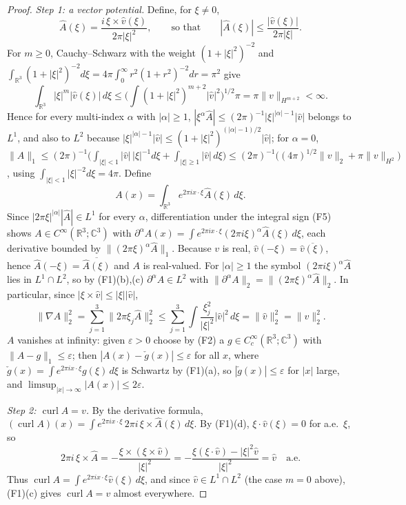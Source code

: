 \documentclass[11pt]{article}
\theoremstyle{definition}
\theoremstyle{plain}
\newcommand{\R}{\mathbb R}
\newcommand{\norm}[1]{\lVert #1\rVert}
\begin{document}
\begin{proof}
\emph{Step 1: a vector potential.}  Define, for $\xi\neq0$,
\[
 \hat A(\xi)=\frac{i\,\xi\times\hat v(\xi)}{2\pi|\xi|^2},
 \qquad\text{so that}\qquad |\hat A(\xi)|\leq\frac{|\hat v(\xi)|}{2\pi|\xi|}.
\]
For $m\geq0$, Cauchy--Schwarz with the weight $(1+|\xi|^2)^{-2}$ and
$\int_{\R^3}(1+|\xi|^2)^{-2}d\xi=4\pi\int_0^\infty r^2(1+r^2)^{-2}dr=\pi^2$
give
\[
 \int_{\R^3}|\xi|^m|\hat v(\xi)|\,d\xi
 \leq\Big(\int(1+|\xi|^2)^{m+2}|\hat v|^2\Big)^{1/2}\pi
 =\pi\norm v_{H^{m+2}}<\infty .
\]
Hence for every multi-index $\alpha$ with $|\alpha|\geq1$,
$|\xi^\alpha\hat A|\leq(2\pi)^{-1}|\xi|^{|\alpha|-1}|\hat v|$ belongs to $L^1$,
and also to $L^2$ because $|\xi|^{|\alpha|-1}|\hat v|\leq(1+|\xi|^2)^{(|\alpha|-1)/2}|\hat v|$;
for $\alpha=0$,
$\norm{\hat A}_1\leq(2\pi)^{-1}\big(\int_{|\xi|<1}|\hat v|\,|\xi|^{-1}d\xi
+\int_{|\xi|\geq1}|\hat v|\,d\xi\big)
\leq(2\pi)^{-1}\big((4\pi)^{1/2}\norm v_2+\pi\norm v_{H^2}\big)$,
using $\int_{|\xi|<1}|\xi|^{-2}d\xi=4\pi$.  Define
\[
 A(x)=\int_{\R^3}e^{2\pi ix\cdot\xi}\hat A(\xi)\,d\xi .
\]
Since $|2\pi\xi|^{|\alpha|}|\hat A|\in L^1$ for every $\alpha$, differentiation
under the integral sign (F5) shows $A\in C^\infty(\R^3;\mathbb C^3)$ with
$\partial^\alpha A(x)=\int e^{2\pi ix\cdot\xi}(2\pi i\xi)^\alpha\hat A(\xi)\,d\xi$,
each derivative bounded by $\norm{(2\pi\xi)^\alpha\hat A}_1$.  Because $v$ is
real, $\hat v(-\xi)=\overline{\hat v(\xi)}$, hence $\hat A(-\xi)=\overline{\hat A(\xi)}$
and $A$ is real-valued.  For $|\alpha|\geq1$ the symbol
$(2\pi i\xi)^\alpha\hat A$ lies in $L^1\cap L^2$, so by (F1)(b),(c)
$\partial^\alpha A\in L^2$ with $\norm{\partial^\alpha A}_2=\norm{(2\pi\xi)^\alpha\hat A}_2$.
In particular, since $|\xi\times\hat v|\leq|\xi||\hat v|$,
\[
 \norm{\nabla A}_2^2=\sum_{j=1}^3\norm{2\pi\xi_j\hat A}_2^2
 \leq\sum_{j=1}^3\int\frac{\xi_j^2}{|\xi|^2}|\hat v|^2\,d\xi
 =\norm{\hat v}_2^2=\norm v_2^2 .
\]
$A$ vanishes at infinity: given $\varepsilon>0$ choose by (F2) a
$g\in C_c^\infty(\R^3;\mathbb C^3)$ with $\norm{\hat A-g}_1\leq\varepsilon$; then
$|A(x)-\check g(x)|\leq\varepsilon$ for all $x$, where
$\check g(x)=\int e^{2\pi ix\cdot\xi}g(\xi)\,d\xi$ is Schwartz by (F1)(a), so
$|\check g(x)|\leq\varepsilon$ for $|x|$ large, and
$\limsup_{|x|\to\infty}|A(x)|\leq2\varepsilon$.

\emph{Step 2: $\operatorname{curl}A=v$.}  By the derivative formula,
$(\operatorname{curl}A)(x)=\int e^{2\pi ix\cdot\xi}\,2\pi i\,\xi\times\hat A(\xi)\,d\xi$.
By (F1)(d), $\xi\cdot\hat v(\xi)=0$ for a.e.\ $\xi$, so
\[
 2\pi i\,\xi\times\hat A
 =-\frac{\xi\times(\xi\times\hat v)}{|\xi|^2}
 =-\frac{\xi(\xi\cdot\hat v)-|\xi|^2\hat v}{|\xi|^2}=\hat v
 \quad\text{a.e.}
\]
Thus $\operatorname{curl}A=\int e^{2\pi ix\cdot\xi}\hat v(\xi)\,d\xi$, and since
$\hat v\in L^1\cap L^2$ (the case $m=0$ above), (F1)(c) gives
$\operatorname{curl}A=v$ almost everywhere.


\end{proof}
\end{document}
